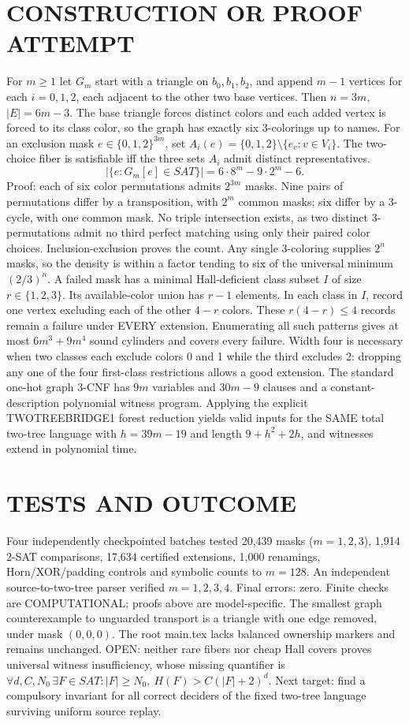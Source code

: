 \documentclass{article}
\begin{document}
\section{CONSTRUCTION OR PROOF ATTEMPT}
For $m\ge1$ let $G_m$ start with a triangle on $b_0,b_1,b_2$, and append $m-1$ vertices for each $i=0,1,2$, each adjacent to the other two base vertices. Then $n=3m$, $|E|=6m-3$. The base triangle forces distinct colors and each added vertex is forced to its class color, so the graph has exactly six 3-colorings up to names.
For an exclusion mask $e\in\{0,1,2\}^{3m}$, set
$A_i(e)=\{0,1,2\}\setminus\{e_v:v\in V_i\}$.
The two-choice fiber is satisfiable iff the three sets $A_i$ admit distinct representatives.
\[
\boxed{|\{e:G_m[e]\in SAT\}|=6\cdot8^m-9\cdot2^m-6.}
\]
Proof: each of six color permutations admits $2^{3m}$ masks. Nine pairs of permutations differ by a transposition, with $2^m$ common masks; six differ by a 3-cycle, with one common mask. No triple intersection exists, as two distinct 3-permutations admit no third perfect matching using only their paired color choices. Inclusion-exclusion proves the count. Any single 3-coloring supplies $2^n$ masks, so the density is within a factor tending to six of the universal minimum $(2/3)^n$.
A failed mask has a minimal Hall-deficient class subset $I$ of size $r\in\{1,2,3\}$. Its available-color union has $r-1$ elements. In each class in $I$, record one vertex excluding each of the other $4-r$ colors. These $r(4-r)\le4$ records remain a failure under EVERY extension. Enumerating all such patterns gives at most $6m^3+9m^4$ sound cylinders and covers every failure. Width four is necessary when two classes each exclude colors 0 and 1 while the third excludes 2: dropping any one of the four first-class restrictions allows a good extension.
The standard one-hot graph 3-CNF has $9m$ variables and $30m-9$ clauses and a constant-description polynomial witness program. Applying the explicit TWOTREEBRIDGE1 forest reduction yields valid inputs for the SAME total two-tree language with $h=39m-19$ and length $9+h^2+2h$, and witnesses extend in polynomial time.
\section{TESTS AND OUTCOME}
Four independently checkpointed batches tested 20,439 masks ($m=1,2,3$), 1,914 2-SAT comparisons, 17,634 certified extensions, 1,000 renamings, Horn/XOR/padding controls and symbolic counts to $m=128$. An independent source-to-two-tree parser verified $m=1,2,3,4$. Final errors: zero. Finite checks are COMPUTATIONAL; proofs above are model-specific. The smallest graph counterexample to unguarded transport is a triangle with one edge removed, under mask $(0,0,0)$. The root main.tex lacks balanced ownership markers and remains unchanged.
\noindent OPEN: neither rare fibers nor cheap Hall covers proves universal witness insufficiency, whose missing quantifier is $\forall d,C,N_0\,\exists F\in SAT: |F|\ge N_0,\ H(F)>C(|F|+2)^d$. Next target: find a compulsory invariant for all correct deciders of the fixed two-tree language surviving uniform source replay.
\end{document}
